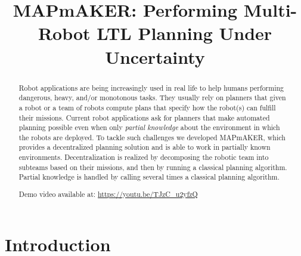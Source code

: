 \documentclass[10pt,conference]{IEEEtran}
\newcommand\patrizio[1]{\nb{Patrizio}{#1}}
\newcommand\claudio[1]{\nb{Claudio}{#1}}
\newcommand{\ra}{$\rightarrow$}
\newcommand{\chg}[2]{\textcolor{red}{\sout{#1}}{\ra}\textcolor{blue}{\uline{#2}}} %
\newcommand{\toolName}{MAPmAKER}
\begin{document}
	
	
	\title{MAPmAKER: Performing Multi-Robot LTL Planning Under Uncertainty}

	
	\author{
	}	
	
	\maketitle

	\begin{abstract}
		Robot applications are being increasingly used in real life to help humans performing dangerous, heavy, and/or monotonous tasks.
		They usually rely on planners that given a robot or a team of robots compute plans that specify how the robot(s) can fulfill their missions.
		Current robot applications ask for planners that make automated planning 
		possible even when only \emph{partial knowledge} about the environment in which the robots are deployed.
		To tackle such challenges we developed \toolName, %
		which provides a decentralized planning solution  and  is able to work in partially known environments.
		Decentralization is realized by decomposing the robotic team into subteams based on their missions, %
		and then by running a classical planning algorithm.
		Partial knowledge is handled by calling several times  a classical planning algorithm.
		
		Demo video available at: \url{https://youtu.be/TJzC_u2yfzQ}
	\end{abstract}
	
	\section{Introduction}
	
	
\end{document}

